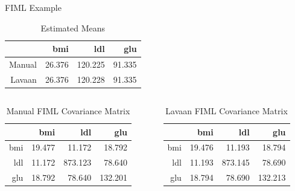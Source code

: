 \documentclass{beamer}\usepackage[]{graphicx}\usepackage[]{color}
\begin{document}

\begin{frame}{FIML Example}
  
\begin{table}[ht]
\centering
\begin{tabular}{rrrr}
  \toprule
 & bmi & ldl & glu \\ 
  \midrule
Manual & 26.376 & 120.225 & 91.335 \\ 
  Lavaan & 26.376 & 120.228 & 91.335 \\ 
   \bottomrule
\end{tabular}
\caption{Estimated Means} 
\end{table}



\begin{columns}
  \begin{column}{0.5\textwidth}
    
\begin{table}[ht]
\centering
\begin{tabular}{rrrr}
  \toprule
 & bmi & ldl & glu \\ 
  \midrule
bmi & 19.477 & 11.172 & 18.792 \\ 
  ldl & 11.172 & 873.123 & 78.640 \\ 
  glu & 18.792 & 78.640 & 132.201 \\ 
   \bottomrule
\end{tabular}
\caption{Manual FIML Covariance Matrix} 
\end{table}


\end{column}
\begin{column}{0.5\textwidth}
  
\begin{table}[ht]
\centering
\begin{tabular}{rrrr}
  \toprule
 & bmi & ldl & glu \\ 
  \midrule
bmi & 19.476 & 11.193 & 18.794 \\ 
  ldl & 11.193 & 873.145 & 78.690 \\ 
  glu & 18.794 & 78.690 & 132.213 \\ 
   \bottomrule
\end{tabular}
\caption{Lavaan FIML Covariance Matrix} 
\end{table}


\end{column}
\end{columns}

\end{frame}

\end{document}

